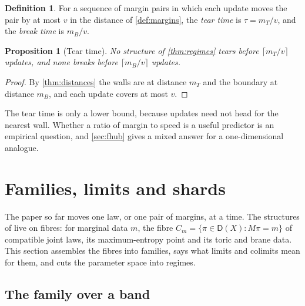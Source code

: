 \documentclass[11pt]{article}
\newtheorem{proposition}[theorem]{Proposition}
\theoremstyle{definition}
\newtheorem{definition}[theorem]{Definition}
\theoremstyle{remark}
\newcommand{\D}{\mathsf{D}}
\begin{document}
\begin{definition}\label{def:teartime}
For a sequence of margin pairs in which each update moves the pair by at most $v$ in the distance of \cref{def:margins}, the
\emph{tear time} is $\tau=m_T/v$, and the \emph{break time} is $m_B/v$.
\end{definition}

\begin{proposition}[Tear time]\label{prop:teartime}
No structure of \cref{thm:regimes} tears before $\lceil m_T/v\rceil$ updates, and none breaks before $\lceil m_B/v\rceil$ updates.
\end{proposition}
\begin{proof}
By \cref{thm:distances} the walls are at distance $m_T$ and the boundary at distance $m_B$, and each update covers at most $v$.
\end{proof}

The tear time is only a lower bound, because updates need not head for the nearest wall. Whether a ratio of margin to speed is
a useful predictor is an empirical question, and \cref{sec:fhub} gives a mixed answer for a one-dimensional analogue.

\section{Families, limits and shards}\label{sec:families}

The paper so far moves one law, or one pair of margins, at a time. The structures of \cite{Bridges} live on fibres: for marginal
data $m$, the fibre $C_m=\{\pi\in\D(X):M\pi=m\}$ of compatible joint laws, its maximum-entropy point and its toric and brane data.
This section assembles the fibres into families, says what limits and colimits mean for them, and cuts the parameter space into
regimes.

\subsection{The family over a band}
\end{document}
